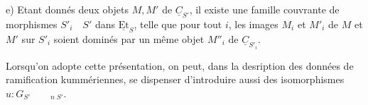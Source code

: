 e) Etant donnés deux objets $M,M'$ de $\underline C_{S'}$, il existe une famille couvrante de morphismes $S'_i\quad S'$ dans $\underline{\mathrm{Et}}_S$, telle que pour tout $i$, les images $M_i$ et $M'_i$ de $M$ et $M'$ sur $S'_i$ soient dominés par un même objet $M''_i$ de  $\underline C_{S'_i}$.

Lorsqu'on adopte cette présentation, on peut, dans la desription des données de ramification kummériennes, se dispenser d'introduire aussi des isomorphismes  $u:G_{S'}\qquad{}_{n\;S'}$.
